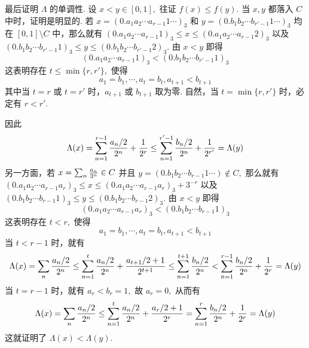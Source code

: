\documentclass[12pt, a4paper, oneside]{book}
\numberwithin{figure}{section}
\theoremstyle{definition}
\begin{document}
最后证明 $\Lambda$ 的单调性. 设 $x<y\in [0,1],$ 往证 $f(x)\leq f(y).$ 当 $x,y$ 都落入 $C$ 中时，证明是明显的. 若 $x=(0.a_1a_2\cdots a_{r-1}1\cdots)_3$ 和 $y=(0.b_1b_2\cdots b_{r'-1}1\cdots)_3$ 均在 $[0,1]\setminus C$ 中，那么就有 $(0.a_1a_2\cdots a_{r-1}1)_3\leq x\leq (0.a_1a_2\cdots a_{r-1}2)_3$ 以及 
$(0.b_1b_2\cdots b_{r'-1}1)_3\leq y\leq (0.b_1b_2\cdots b_{r'-1}2)_3.$ 由 $x<y$ 即得
\begin{equation}
    (0.a_1a_2\cdots a_{r-1}1)_3<(0.b_1b_2\cdots b_{r'-1}1)_3
\end{equation}
这表明存在 $t\leq \min\{r,r'\},$ 使得 
\begin{equation}
    a_1=b_1,\cdots,a_{t}=b_{t},a_{t+1}<b_{t+1}
\end{equation}
其中当 $t=r$ 或 $t=r'$ 时，$a_{t+1}$ 或 $b_{t+1}$ 取为零. 自然，当 $t=\min\{r,r'\}$ 时，必定有 $r<r'.$

因此 
\begin{equation}
    \Lambda(x)=\sum_{n=1}^{r-1}{a_n/2\over 2^n}+{1\over 2^r}\leq\sum_{n=1}^{r'-1}{b_n/2\over 2^n}+{1\over 2^{r'}}=\Lambda(y)
\end{equation}
另一方面，若 $x=\sum_n {a_n\over 3^n}\in C$ 并且 $y=(0.b_1b_2\cdots b_{r-1}1\cdots)\notin C,$ 那么就有
 $(0.a_1a_2\cdots a_{r-1}a_r)_3\leq x\leq (0.a_1a_2\cdots a_{r-1}a_r)_3+3^{-r}$ 以及 
$(0.b_1b_2\cdots b_{r-1}1)_3\leq y\leq (0.b_1b_2\cdots b_{r-1}2)_3.$ 由 $x<y$ 即得
\begin{equation}
    (0.a_1a_2\cdots a_{r-1}a_r)_3<(0.b_1b_2\cdots b_{r-1}1)_3
\end{equation}
这表明存在 $t< r,$ 使得 
\begin{equation}
    a_1=b_1,\cdots,a_{t}=b_{t},a_{t+1}<b_{t+1}
\end{equation}
当 $t<r-1$ 时，就有
\begin{equation}
    \Lambda(x)=\sum_{n}{a_n/2\over 2^n}\leq\sum_{n=1}^t {a_n/2\over 2^n}+{a_{t+1}/2+1\over 2^{t+1}}\leq\sum_{n=1}^{t+1}{b_n/2\over 2^n}<\sum_{n=1}^{r-1}{b_n/2\over 2^n}+{1\over 2^r}=\Lambda(y)
\end{equation}
当 $t=r-1$ 时，就有 $a_r<b_r=1,$ 故 $a_r=0,$ 从而有
\begin{equation}
    \Lambda(x)=\sum_{n}{a_n/2\over 2^n}\leq\sum_{n=1}^t {a_n/2\over 2^n}+{a_{r}/2+1\over 2^{r}}=\sum_{n=1}^{r}{b_n/2\over 2^n}+{1\over 2^r}=\Lambda(y)
\end{equation}
这就证明了 $\Lambda(x)<\Lambda(y).$ 
\end{document}

